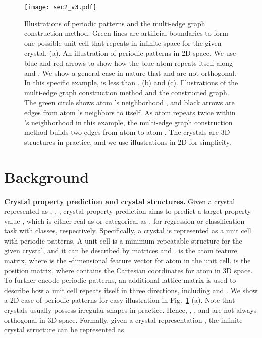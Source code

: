 \documentclass{article}
\begin{document}
\begin{figure}
    \centering
    \texttt{[image: sec2\_v3.pdf]}
    \vspace{-1mm}
    \caption{
    Illustrations of periodic patterns and the multi-edge graph construction method.
    Green lines are artificial boundaries to form one possible unit cell that repeats in infinite space for the given crystal.
    (a). An illustration of periodic patterns in 2D space. 
    We use blue and red arrows to show how the blue atom repeats itself along  and . We show a general case in nature that  and  are not orthogonal.
    In this specific example,  is less than .
    (b) and (c). Illustrations of the multi-edge graph construction method and the constructed graph. The green circle shows atom 's neighborhood ,
    and black arrows are edges from atom 's neighbors to itself.
    As atom  repeats twice within 's neighborhood in this example, 
    the multi-edge graph construction method builds two edges from atom  to atom .
    The crystals are 3D structures in practice, and we use illustrations in 2D for simplicity. 
    }
    \vspace{-4mm}
    \label{fig:1}
\end{figure}


\section{Background} \label{sec: backg}
\label{sec:pre}




\textbf{Crystal property prediction and crystal structures.}
Given a crystal represented as , , ,
crystal property prediction aims to predict a target property value , which is either real as  or categorical as 
,
for regression or classification task with  classes, respectively. 
Specifically, a crystal is represented as a unit cell with periodic patterns.
A unit cell is a minimum repeatable structure for the given crystal,
and it can be described by matrices  and .
 is the atom feature matrix, where  is the -dimensional feature vector for atom  in the unit cell.
 is the position matrix, where  contains the Cartesian coordinates for atom  in 3D space.
To further encode periodic patterns, an additional lattice matrix
 is used to describe how a unit cell repeats itself in three directions, including  and . We show a 2D case of periodic patterns for easy illustration in Fig.~\ref{fig:1} (a). Note that crystals usually possess irregular shapes in practice. Hence, 
, , and  are not always orthogonal in 3D space.
Formally, given a crystal representation ,  the infinite crystal structure can be represented as
\end{document}
